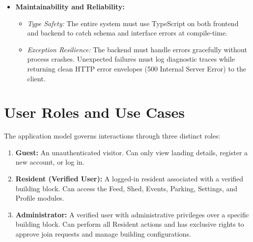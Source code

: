 \begin{itemize}
    \item \textbf{Maintainability and Reliability:}
    \begin{itemize}
        \item \emph{Type Safety:} The entire system must use TypeScript on both frontend and backend to catch schema and interface errors at compile-time.
        \item \emph{Exception Resilience:} The backend must handle errors gracefully without process crashes. Unexpected failures must log diagnostic traces while returning clean HTTP error envelopes (500 Internal Server Error) to the client.
    \end{itemize}
\end{itemize}

\section{User Roles and Use Cases}
The application model governs interactions through three distinct roles:
\begin{enumerate}
    \item \textbf{Guest:} An unauthenticated visitor. Can only view landing details, register a new account, or log in.
    \item \textbf{Resident (Verified User):} A logged-in resident associated with a verified building block. Can access the Feed, Shed, Events, Parking, Settings, and Profile modules.
    \item \textbf{Administrator:} A verified user with administrative privileges over a specific building block. Can perform all Resident actions and has exclusive rights to approve join requests and manage building configurations.
\end{enumerate}

